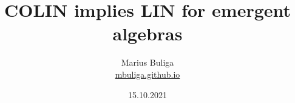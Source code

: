 \documentclass{article}
\begin{document}
\pagestyle{plain}










\newtheorem{theorem}{Theorem}[section]

\newtheorem{proposition}[theorem]{Proposition}

\newtheorem{lema}[theorem]{Lemma}

\newtheorem{corollary}[theorem]{Corollary}

\newtheorem{definition}[theorem]{Definition}

\newtheorem{remark}[theorem]{Remark}

\newtheorem{exempl}{Example}[section]

\newenvironment{example}{\begin{exempl}  \em}{\hfill $\square$

\end{exempl}}  \vspace{.5cm}









\renewcommand{\contentsname}{ }


\title{COLIN implies LIN for emergent algebras}

\author{Marius Buliga \\ \href{https://mbuliga.github.io}{mbuliga.github.io}}

\date{15.10.2021}

\maketitle
\end{document}
